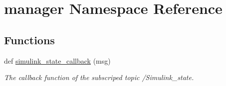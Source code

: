 \hypertarget{namespacemanager}{}\section{manager Namespace Reference}
\label{namespacemanager}
\subsection*{Functions}
\begin{DoxyCompactItemize}
\item 
def \hyperlink{namespacemanager_ae7c336047eda26124f4453e77f436139}{simulink\+\_\+state\+\_\+callback} (msg)
\begin{DoxyCompactList}\small\item\em The callback function of the subscriped topic /\+Simulink\+\_\+state. \end{DoxyCompactList}\end{DoxyCompactItemize}

